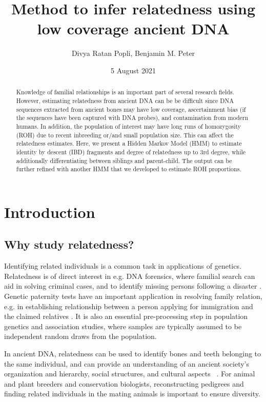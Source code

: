 \documentclass[12pt, letterpaper]{article}
\title{Method to infer relatedness using low coverage ancient DNA}
\author{Divya Ratan Popli, Benjamin M. Peter}
\date{5 August 2021}
\begin{document}
\nolinenumbers

\maketitle

\begin{abstract}

\noindent Knowledge of familial relationships is an important part of several research fields. However, estimating relatedness from ancient DNA can be be difficult since DNA sequences extracted from ancient bones may have low coverage, ascertainment bias (if the sequences have been captured with DNA probes), and contamination from modern humans. In addition, the population of interest may have long runs of homozygosity (ROH) due to recent inbreeding or/and small population size. This can affect the relatedness estimates. Here, we present a Hidden Markov Model (HMM) to estimate identity by descent (IBD) fragments and degree of relatedness up to 3rd degree, while additionally differentiating between siblings and parent-child. The output can be further refined with another HMM that we developed to estimate ROH proportions.
\end{abstract}

\section{Introduction}

\subsection{Why study relatedness?}

Identifying related individuals is a common task in applications of genetics. Relatedness is of direct interest in e.g. DNA forensics, where familial search can aid in solving criminal cases, and to identify missing persons following a disaster \cite{murphy_law_2018,ram_genealogy_2018}. Genetic paternity tests have an important application in resolving family relation, e.g. in establishing relationship between a person applying for immigration and the claimed relatives \cite{egeland_beyond_2000}. It is also an essential pre-processing step in population genetics and association studies, where samples are typically assumed to be independent random draws from the population.

In ancient DNA, relatedness can be used to identify bones and teeth belonging to the same individual, and can provide an  understanding of an ancient society's organization and hierarchy, social structures, and cultural aspects ~\cite{baca_ancient_2012,mittnik_KINship-based_2019,sikora_ancient_2017}. For animal and plant breeders and conservation biologists, reconstructing pedigrees and finding related individuals in the mating animals is important to ensure diversity. ~\cite{habier_impact_2007,oliehoek_estimating_2006,kardos_measuring_2015} 
\end{document}
